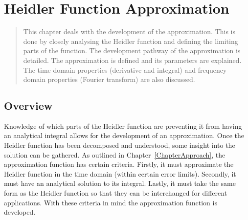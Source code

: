 
\chapter{Heidler Function Approximation} %

\label{ChapterApprox} %

\begin{quote}
This chapter deals with the development of the approximation. This is done by closely analysing the Heidler function and defining the limiting parts of the function. The development pathway of the approximation is detailed. The approximation is defined and its parameters are explained. The time domain properties (derivative and integral) and frequency domain properties (Fourier transform) are also discussed.
\end{quote}


\section{Overview}
\label{sec:approx_overview}
Knowledge of which parts of the Heidler function are preventing it from having an analytical integral allows for the development of an approximation. Once the Heidler function has been decomposed and understood, some insight into the solution can be gathered. As outlined in Chapter~\ref{ChapterApproach}, the approximation function has certain criteria. Firstly, it must approximate the Heidler function in the time domain (within certain error limits). Secondly, it must have an analytical solution to its integral. Lastly, it must take the same form as the Heidler function so that they can be interchanged for different applications. With these criteria in mind the approximation function is developed.


